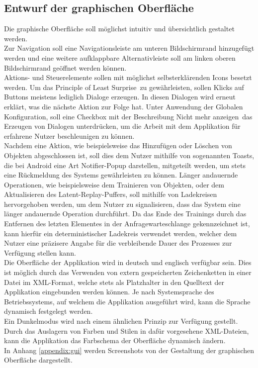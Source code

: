 \documentclass[oneside]{ausarbeitung}
\begin{document}
\subsection{Entwurf der graphischen Oberfläche}
Die graphische Oberfläche soll möglichst intuitiv und übersichtlich gestaltet werden.\\
Zur Navigation soll eine Navigationsleiste am unteren Bildschirmrand hinzugefügt werden und eine weitere aufklappbare Alternativleiste soll am linken oberen Bildschirmrand geöffnet werden können.\\
Aktions- und Steuerelemente sollen mit möglichst selbsterklärenden Icons besetzt werden. Um das \glqq Principle of Least Surprise\grqq\ zu gewährleisten, sollen Klicks auf Buttons meistens lediglich Dialoge erzeugen. In diesen Dialogen wird erneut erklärt, was die nächste Aktion zur Folge hat. Unter Anwendung der Globalen Konfiguration, soll eine Checkbox mit der Beschreibung \glqq Nicht mehr anzeigen\grqq\ das Erzeugen von Dialogen unterdrücken, um die Arbeit mit dem Applikation für erfahrene Nutzer beschleunigen zu können.\\
Nachdem eine Aktion, wie beispielsweise das Hinzufügen oder Löschen von Objekten abgeschlossen ist, soll dies dem Nutzer mithilfe von sogenannten Toasts, die bei Android eine Art Notifier-Popup darstellen, mitgeteilt werden, um stets eine Rückmeldung des Systems gewährleisten zu können. Länger andauernde Operationen, wie beispielsweise dem Trainieren von Objekten, oder dem Aktualisieren des Latent-Replay-Puffers, soll mithilfe von Ladekreisen hervorgehoben werden, um dem Nutzer zu signalisieren, dass das System eine länger andauernde Operation durchführt. Da das Ende des Trainings durch das Entfernen des letzten Elementes in der Anfragewarteschlange gekennzeichnet ist, kann hierfür ein deterministischer Ladekreis verwendet werden, welcher dem Nutzer eine präzisere Angabe für die verbleibende Dauer des Prozesses zur Verfügung stellen kann.\\
Die Oberfläche der Applikation wird in deutsch und englisch verfügbar sein. Dies ist möglich durch das Verwenden von extern gespeicherten Zeichenketten in einer Datei im XML-Format, welche stets als Platzhalter in den Quelltext der Applikation eingebunden werden können. Je nach Systemsprache des Betriebssystems, auf welchem die Applikation ausgeführt wird, kann die Sprache dynamisch festgelegt werden.\\
Ein Dunkelmodus wird nach einem ähnlichen Prinzip zur Verfügung gestellt. Durch das Auslagern von Farben und Stilen in dafür vorgesehene XML-Dateien, kann die Applikation das Farbschema der Oberfläche dynamisch ändern.\\
In Anhang \ref{appendix:gui} werden Screenshots von der Gestaltung der graphischen Oberfläche dargestellt.
\end{document}
